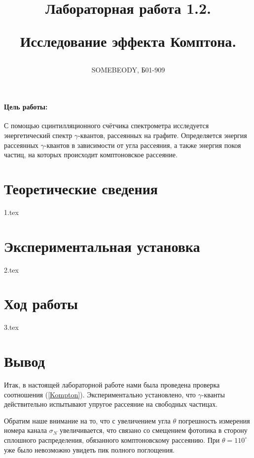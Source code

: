 \documentclass[a5paper, 10pt, twoside]{article} %
\title
{\hfill \break  \hfill \break
\hfill \break  \hfill \break
Лабораторная работа 1.2.

Исследование эффекта Комптона.}
\author{SOMEBEODY, Б01-909}
\begin{document}
\maketitle



\thispagestyle{empty} %

\newpage

\tableofcontents %
\thispagestyle{plain}
\newpage


\paragraph{Цель работы:}
С помощью сцинтилляционного счётчика спектрометра исследуется энергетический
спектр $\gamma$-квантов, рассеянных на графите. Определяется энергия рассеянных
$\gamma$-квантов в зависимости от угла рассеяния, а также энергия покоя частиц,
на которых происходит комптоновское рассеяние.

\section{Теоретические сведения}
{1.tex}

\newpage
\section{Экспериментальная установка}
{2.tex}

\newpage
\section{Ход работы}
{3.tex}

\newpage
\section{Вывод}

Итак, в настоящей лабораторной работе нами была проведена проверка соотношения
(\ref{Kompton}). Экспериментально установлено, что $\gamma$-кванты действительно
испытывают упругое рассеяние на свободных частицах.

Обратим наше внимание на то, что с увеличением угла $\theta$ погрешность
измерения номера канала $\sigma_N$ увеличивается, что связано со смещением
фотопика в сторону сплошного распределения, обязанного комптоновскому
рассеянию. При $\theta = 110^\circ$ уже было невозможно увидеть пик полного
поглощения.
\end{document}
